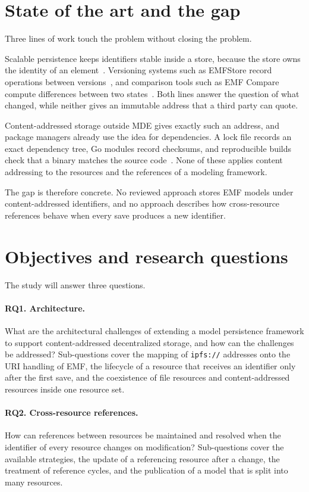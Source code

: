 \documentclass[11pt,a4paper]{article}
\begin{document}
\section{State of the art and the gap}

Three lines of work touch the problem without closing the problem.

Scalable persistence keeps identifiers stable inside a store, because the store owns the identity of an element~\cite{pagan2015repository,daniel2017neoemf,cdo}. Versioning systems such as EMFStore record operations between versions~\cite{koegel2010emfstore}, and comparison tools such as EMF Compare compute differences between two states~\cite{emfcompare}. Both lines answer the question of what changed, while neither gives an immutable address that a third party can quote.

Content-addressed storage outside MDE gives exactly such an address, and package managers already use the idea for dependencies. A lock file records an exact dependency tree, Go modules record checksums, and reproducible builds check that a binary matches the source code~\cite{npmpackagelock,lamb2022reproducible}. None of these applies content addressing to the resources and the references of a modeling framework.

The gap is therefore concrete. No reviewed approach stores EMF models under content-addressed identifiers, and no approach describes how cross-resource references behave when every save produces a new identifier.

\section{Objectives and research questions}

The study will answer three questions.

\paragraph{RQ1. Architecture.} What are the architectural challenges of extending a model persistence framework to support content-addressed decentralized storage, and how can the challenges be addressed? Sub-questions cover the mapping of \texttt{ipfs://} addresses onto the URI handling of EMF, the lifecycle of a resource that receives an identifier only after the first save, and the coexistence of file resources and content-addressed resources inside one resource set.

\paragraph{RQ2. Cross-resource references.} How can references between resources be maintained and resolved when the identifier of every resource changes on modification? Sub-questions cover the available strategies, the update of a referencing resource after a change, the treatment of reference cycles, and the publication of a model that is split into many resources.
\end{document}
